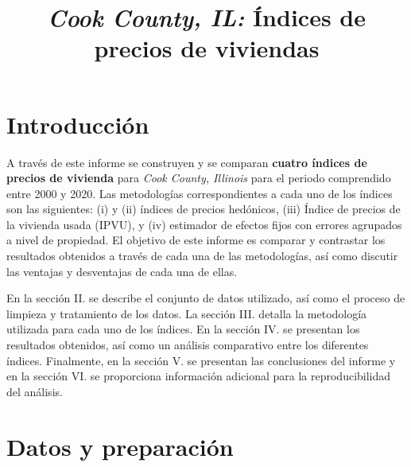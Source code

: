 \documentclass[conference]{IEEEtran}
\begin{document}
\title{\textit{Cook County, IL:} Índices de precios de viviendas}

\author{%
\and
{}
\and
{}
}



\maketitle


\section{Introducción}

A través de este informe se construyen y se comparan \textbf{cuatro índices de precios de vivienda} para 
\textit{Cook County, Illinois} para el periodo comprendido entre 2000 y 2020. Las metodologías correspondientes a 
cada uno de los índices son las siguientes: (i) y (ii) índices de precios hedónicos, (iii) Índice de precios de la vivienda usada (IPVU), 
y (iv) estimador de efectos fijos con errores agrupados a nivel de propiedad. El objetivo de este informe es comparar y contrastar
 los resultados obtenidos a través de cada una de las metodologías, así como discutir las ventajas y desventajas de cada una de ellas.

En la sección II. se describe el conjunto de datos utilizado, así como el proceso de limpieza y tratamiento de los datos.
  La sección III. detalla la metodología utilizada para cada uno de los índices. En la sección IV. se presentan los resultados obtenidos, 
  así como un análisis comparativo entre los diferentes índices. Finalmente, en la sección V. se presentan las conclusiones del informe 
  y en la sección VI. se proporciona información adicional para la reproducibilidad del análisis.

\section{Datos y preparación}
\end{document}
